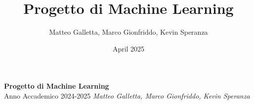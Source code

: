\documentclass[12pt,a4paper,openany,oneside]{book}
\title{Progetto di Machine Learning}
\author{Matteo Galletta, Marco Gionfriddo, Kevin Speranza}
\date{April 2025}
\begin{document}
\begin{titlepage}
    \centering
    \vspace*{3cm}
    {\Huge \textbf{Progetto di Machine Learning}}\\[1.5cm]
    {\Large Anno Accademico 2024-2025}
    \vfill
    \normalsize{\textit{Matteo Galletta, Marco Gionfriddo, Kevin Speranza}}
\end{titlepage}
\tableofcontents
\newpage
{}
\end{document}
